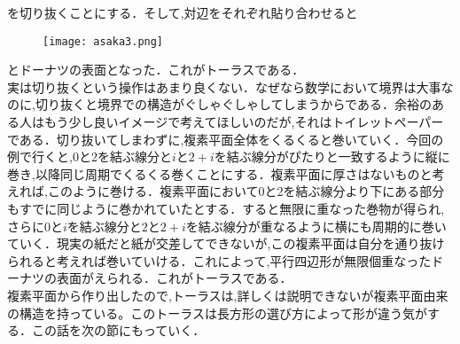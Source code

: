 を切り抜くことにする．そして,対辺をそれぞれ貼り合わせると
\\
\begin{figure}[h]
\texttt{[image: asaka3.png]}
\end{figure}
とドーナツの表面となった．これがトーラスである．\\
実は切り抜くという操作はあまり良くない．なぜなら数学において境界は大事なのに,切り抜くと境界での構造がぐしゃぐしゃしてしまうからである．余裕のある人はもう少し良いイメージで考えてほしいのだが,それはトイレットペーパーである．切り抜いてしまわずに,複素平面全体をくるくると巻いていく．今回の例で行くと,0と2を結ぶ線分と$i$と$2+i$を結ぶ線分がぴたりと一致するように縦に巻き,以降同じ周期でくるくる巻くことにする．複素平面に厚さはないものと考えれば,このように巻ける．複素平面において0と2を結ぶ線分より下にある部分もすでに同じように巻かれていたとする．すると無限に重なった巻物が得られ,さらに$0$と$i$を結ぶ線分と$2$と$2+i$を結ぶ線分が重なるように横にも周期的に巻いていく．現実の紙だと紙が交差してできないが,この複素平面は自分を通り抜けられると考えれば巻いていける．これによって,平行四辺形が無限個重なったドーナツの表面がえられる．これがトーラスである．\\
複素平面から作り出したので,トーラスは,詳しくは説明できないが複素平面由来の構造を持っている。このトーラスは長方形の選び方によって形が違う気がする．この話を次の節にもっていく．

